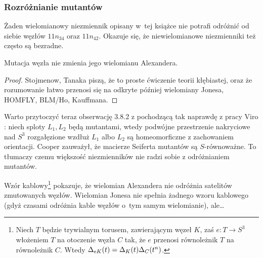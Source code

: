 \subsubsection{Rozróżnianie mutantów}
Żaden wielomianowy niezmiennik opisany w~tej książce nie potrafi odróżnić od siebie węzłów $11n_{34}$ oraz $11n_{42}$.
Okazuje się, że niewielomianowe niezmienniki też często są bezradne.

\begin{proposition}
    Mutacja węzła nie zmienia jego wielomianu Alexandera.
%
\end{proposition}


\begin{proof}
    Stojmenow, Tanaka \cite[s. 1]{tanaka2009} piszą, że to proste ćwiczenie teorii kłębiastej, oraz że rozumowanie łatwo przenosi się na odkryte później wielomiany Jonesa, HOMFLY, BLM/Ho, Kauffmana.
\end{proof}

Warto przytoczyć teraz obserwację 3.8.2 z \cite[s. 43]{kawauchi1996} pochodzącą tak naprawdę z pracy Viro \cite{viro1973}: niech sploty $L_1, L_2$ będą mutantami, wtedy podwójne przestrzenie nakryciowe nad $S^3$ rozgałęzione wzdłuż $L_1$ albo $L_2$ są homeomorficzne z zachowaniem orientacji.
Cooper \cite{cooper1982} zauważył, że macierze Seiferta mutantów są $S$-równoważne.
%
To tłumaczy czemu większość niezmienników nie radzi sobie z odróżnianiem mutantów.

Wzór kablowy\footnote{Niech $T$ będzie trywialnym torusem, zawierającym węzeł $K$, zaś $e \colon T \to S^3$ włożeniem $T$ na otoczenie węzła $C$ tak, że $e$ przenosi równoleżnik $T$ na równoleżnik $C$. Wtedy $\Delta_{eK} (t) = \Delta_K(t)\Delta_C(t^n)$.} \cite[tw. 6.15]{lickorish1997} pokazuje, że wielomian Alexandera nie odróżnia satelitów zmutowanych węzłów.
Wielomian Jonesa nie spełnia żadnego wzoru kablowego (gdyż czasami odróżnia kable węzłów o~tym samym wielomianie), ale…
%

